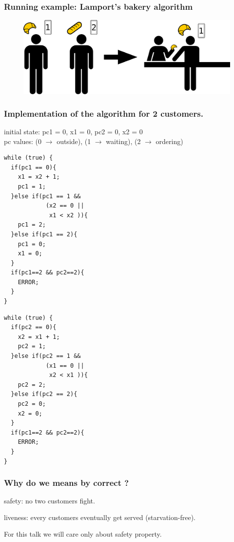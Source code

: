 \documentclass{beamer}
\begin{document}
\begin{frame}
  \frametitle{Running example: Lamport's bakery algorithm}
  \vfill

  \begin{figure}[!h]
  \includegraphics[scale=0.4]{ticket}
  \end{figure}

  \vspace{1cm}
\end{frame}

\begin{frame}[fragile]
  \frametitle{Implementation of the algorithm for 2 customers.}
\begin{center}
{\footnotesize
initial state: pc1 = 0, x1 = 0, pc2 = 0, x2 = 0\\
pc values: (0 $\rightarrow$ outside), (1 $\rightarrow$ waiting), (2 $\rightarrow$ ordering)
}
\end{center}
\begin{minipage}{0.45\linewidth}
\begin{lstlisting}
while (true) {
  if(pc1 == 0){
    x1 = x2 + 1;
    pc1 = 1;
  }else if(pc1 == 1 &&
            (x2 == 0 ||
             x1 < x2 )){
    pc1 = 2;
  }else if(pc1 == 2){
    pc1 = 0;
    x1 = 0;
  }
  if(pc1==2 && pc2==2){
    ERROR;
  }
}
\end{lstlisting}
\end{minipage}
\hfill
\begin{minipage}{0.45\linewidth}
\begin{lstlisting}
while (true) {
  if(pc2 == 0){
    x2 = x1 + 1;
    pc2 = 1;
  }else if(pc2 == 1 &&
            (x1 == 0 ||
             x2 < x1 )){
    pc2 = 2;
  }else if(pc2 == 2){
    pc2 = 0;
    x2 = 0;
  }
  if(pc1==2 && pc2==2){
    ERROR;
  }
}
\end{lstlisting}
\end{minipage}
\end{frame}

\begin{frame}
  \frametitle{Why do we means by correct ?}
  safety: no two customers fight.
  
  \vspace{5mm}

  liveness: every customers eventually get served (starvation-free).

  \vspace{1cm}

  For this talk we will care only about \alert{safety} property.

\end{frame}
\end{document}
